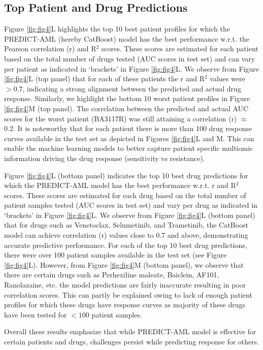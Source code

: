 \documentclass[pdflatex,sn-mathphys-num]{sn-jnl}%
\theoremstyle{thmstyleone}%
\theoremstyle{thmstyletwo}%
\theoremstyle{thmstylethree}%
\begin{document}
\subsection{Top Patient and Drug Predictions}
Figure \ref{fig:fig4}L highlights the top 10 best patient profiles for which the PREDICT-AML (hereby CatBoost) model has the best performance w.r.t. the Pearson correlation (r) and R$^2$ scores. These scores are estimated for each patient based on the total number of drugs tested (AUC scores in test set) and can vary per patient as indicated in `brackets' in Figure \ref{fig:fig4}L. We observe from Figure \ref{fig:fig4}L (top panel) that for each of these patients the r and R$^2$ values were $> 0.7$, indicating a strong alignment between the predicted and actual drug response. Similarly, we highlight the bottom 10 worst patient profiles in Figure \ref{fig:fig4}M (top panel). The correlation between the predicted and actual AUC scores for the worst patient (BA3117R) was still attaining a correlation (r) $\approx$ 0.2. It is noteworthy that for each patient there is more than 100 drug response curves available in the test set as depicted in Figures \ref{fig:fig4}L and M. This can enable the machine learning models to better capture patient specific multiomic information driving the drug response (sensitivity vs resistance).

Figure \ref{fig:fig4}L (bottom panel) indicates the top 10 best drug predictions for which the PREDICT-AML model has the best performance w.r.t. r and R$^2$ scores. These scores are estimated for each drug based on the total number of patient samples tested (AUC scores in test set) and vary per drug as indicated in `brackets' in Figure \ref{fig:fig4}L. We observe from Figure \ref{fig:fig4}L (bottom panel) that for drugs such as Venetoclax, Selumetinib, and Trametinib, the CatBoost model can achieve correlation (r) values close to 0.7 and above, demonstrating accurate predictive performance. For each of the top 10 best drug predictions, there were over 100 patient samples available in the test set (see Figure \ref{fig:fig4}L). However, from Figure \ref{fig:fig4}M (bottom panel), we observe that there are certain drugs such as Perhexiline maleate, Baiclein, AF101, Ranolazaine, etc. the model predictions are fairly inaccurate resulting in poor correlation scores. This can partly be explained owing to lack of enough patient profiles for which these drugs have response curves as majority of these drugs have been tested for $< 100$ patient samples. 

Overall these results emphasize that while PREDICT-AML model is effective for certain patients and drugs, challenges persist while predicting response for others. 
\end{document}
